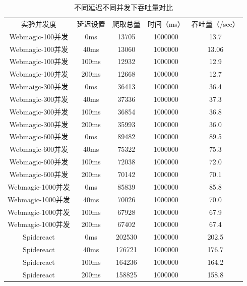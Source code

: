 \documentclass[master]{njuthesis}
\begin{document}
\begin{table}
\centering
\begin{tabular}{|c|c|c|c|c|}
\hline
实验并发度& 延迟设置 & 爬取总量 & 时间（ms） & 吞吐量（/sec） \\
Webmagic-100并发 & 0ms  & 13705 & 1000000 & 13.7 \\
Webmagic-100并发 & 40ms & 13060 & 1000000 & 13.06 \\
Webmagic-100并发 & 100ms & 12932 & 1000000 & 12.9 \\
Webmagic-100并发 & 200ms & 12668 & 1000000 & 12.7 \\
Webmaigc-300并发 & 0ms  & 36413 & 1000000 & 36.4 \\
Webmagic-300并发 & 40ms & 37336 & 1000000 & 37.3 \\
Webmagic-300并发 & 100ms & 36854 & 1000000 & 36.8 \\
Webmagic-300并发 & 200ms & 35993 & 1000000 & 36.0 \\
Webmagic-600并发 & 0ms  & 89482 & 1000000 & 89.5 \\
Webmagic-600并发 & 40ms & 75322 & 1000000 & 75.3 \\
Webmagic-600并发 & 100ms & 72038 & 1000000 & 72.0 \\
Webmagic-600并发 & 200ms & 70142 & 1000000 & 70.1 \\
Webmagic-1000并发 & 0ms  & 85839 & 1000000 & 85.8 \\
Webmagic-1000并发 & 40ms & 70026 & 1000000 & 70.0 \\
Webmagic-1000并发 & 100ms & 67928 & 1000000 & 67.9 \\
Webmagic-1000并发 & 200ms & 67402 & 1000000 & 67.4 \\
Spidereact & 0ms  & 202530  & 1000000 & 202.5 \\
Spidereact & 40ms & 176721 & 1000000 & 176.7 \\
Spidereact & 100ms & 164236 & 1000000 & 164.2 \\
Spidereact & 200ms & 158825 & 1000000 & 158.8 \\
\hline
\end{tabular}
\caption{不同延迟不同并发下吞吐量对比}\label{table:throughputAll}
\end{table}
\end{document}
